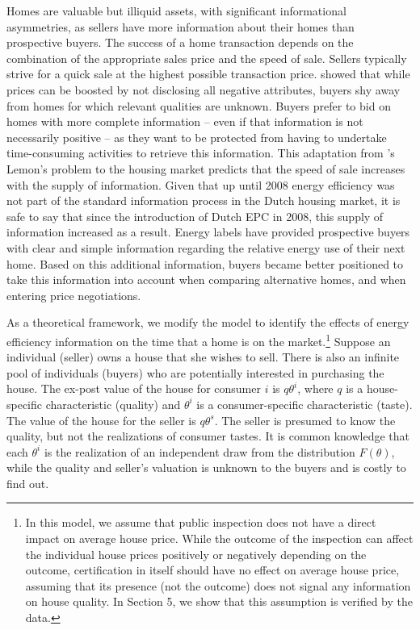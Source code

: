 \documentclass[12pt]{article}
\begin{document}
Homes are valuable but illiquid assets, with significant informational asymmetries, as sellers have more information about their homes than prospective buyers. The success of a home transaction depends on the combination of the appropriate sales price and the  speed of sale. Sellers typically strive for a quick sale at the highest possible transaction price. \cite{taylor1999time} showed that while prices can be boosted by not disclosing all negative attributes, buyers shy away from homes for which relevant qualities are unknown. Buyers prefer to bid on homes with more complete information – even if that information is not necessarily positive – as they want to be protected from having to undertake time-consuming activities to retrieve this information. This adaptation from \cite{akerlof1970vthe}'s Lemon's problem to the housing market predicts that the speed of sale increases with the supply of information. Given that up until 2008 energy efficiency was not part of the standard information process in the Dutch housing market, it is safe to say that since the introduction of Dutch EPC in 2008, this supply of information increased as a result. Energy labels have provided prospective buyers with clear and simple information regarding the relative energy use of their next home. Based on this additional information, buyers became better positioned to take this information into account when comparing alternative homes, and when entering price negotiations.   

As a theoretical framework, we modify the \cite{taylor1999time} model to identify the effects of energy efficiency information on the time that a home is on the market.\footnote{In this model, we assume that public inspection does not have a direct impact on average house price. While the outcome of the inspection can affect the individual house prices positively or negatively depending on the outcome, certification in itself should have no effect on average house price, assuming that its presence (not the outcome) does not signal any information on house quality. In Section 5, we show that this assumption is verified by the data.}  Suppose an individual (seller) owns a house that she wishes to sell. There is also an infinite pool of individuals (buyers) who are potentially interested in purchasing the house. The ex-post value of the house for consumer $i$ is $q \theta^i$, where $q$ is a house-specific characteristic (quality) and $\theta^i$ is a consumer-specific characteristic (taste). The value of the house for the seller is  $q \theta^s$. The seller is presumed to know the quality, but not the realizations of consumer tastes. It is common knowledge that each $\theta^i$ is the realization of an independent draw from the distribution $F(\theta)$, while the quality and seller's valuation is unknown to the buyers and is costly to find out. 
\end{document}

